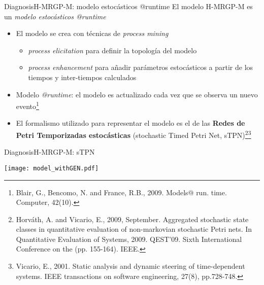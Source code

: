 \documentclass[9pt, handout]{beamer}
\begin{document}
      \begin{frame}{Diagnosis}{H-MRGP-M: modelo estocásticos @runtime}
        El modelo H-MRGP-M es un \textit{modelo estocásticos @runtime}
        \begin{itemize}
          \item El modelo se crea con técnicas de \textit{process mining}
          \begin{itemize}
            \item \textit{process elicitation} para definir la topología del modelo
            \item \textit{process enhancement} para añadir parámetros estocásticos a partir de los tiempos y inter-tiempos calculados
          \end{itemize}
          \item Modelo \textit{@runtime}: el modelo es actualizado cada vez que se observa un nuevo evento\footnote{Blair, G., Bencomo, N. and France, R.B., 2009. Models@ run. time. Computer, 42(10).}
          \item El formalismo utilizado para representar el modelo es el de las \textbf{Redes de Petri Temporizadas estocásticas} (stochastic Timed Petri Net, sTPN)\footnote{Horváth, A. and Vicario, E., 2009, September. Aggregated stochastic state classes in quantitative evaluation of non-markovian stochastic Petri nets. In Quantitative Evaluation of Systems, 2009. QEST'09. Sixth International Conference on the (pp. 155-164). IEEE.}\footnote{Vicario, E., 2001. Static analysis and dynamic steering of time-dependent systems. IEEE transactions on software engineering, 27(8), pp.728-748.}
        \end{itemize}
      \end{frame}
      
      \begin{frame}{Diagnosis}{H-MRGP-M: sTPN}
        \begin{center}
          \texttt{[image: model\_withGEN.pdf]}
        \end{center}
      \end{frame}
      
\end{document}
